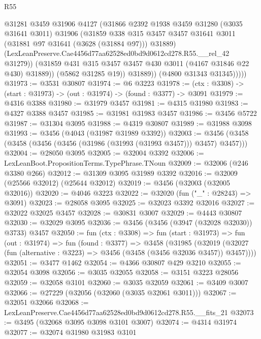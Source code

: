 \begin{lexlean}{R55}
\begin{coremodule}
                    @31281
                    @3459
                    @31906
                    @4127
                    (@31866
                      @2392
                      @1938
                      @3459
                      @31280
                      (@3035 @31641 @3011)
                      @31906
                      (@31859
                        @338
                        @315
                        @3457
                        @3457
                        @31641
                        @3011
                        (@31881 @97 @31641 (@3628 (@31884 @97)))
                        @31889)
                      (LexLeanPreserve.Cae4456d77aa62528ed0bd9d0612cd278.R55.__rel_42 @31279))
                    (@31859 @431 @315 @3457 @3457 @430 @3011 (@4167 @31846 @22 @430) @31889))
                  (@5862 @31285 @19))
                @31889))
            (@4800 @31343 @31345)))))
@31973 := @3531 @30807
@31974 := @6 @3223
@31978 := (ctx : @3308) -> (start : @31973) -> (out : @31974) -> (found : @3377) -> @3091
@31979 := @4316 @3388
@31980 := @31979 @3457
@31981 := @4315 @31980
@31983 := @4327 @3388 @3457
@31985 := @31981 @31983 @3457
@31986 := @3456 @5722
@31987 := @31304 @3095
@31988 := @4319 @30807
@31989 := @31988 @3098
@31993 := @3456 (@4043 (@31987 @31989 @3392))
@32003 := @3456 (@3458 (@3458 (@3456 (@3456 (@31986 (@31993 (@31993 @3457))) @3457) @3457)))
@32004 := @28050 @3095
@32005 := @32004 @3392
@32006 := LexLeanBoot.PropositionTerms.TypePhrase.TNoun
@32009 := @32006 (@246 @3380 @266)
@32012 := @31309 @3095 @31989 @3392
@32016 := @32009 (@25566 @32012) (@25644 @32012)
@32019 := @3456 (@32003 (@32005 @32016))
@32020 := @4046 @3223
@32022 := @32020 (fun ("_" : @28243) => @3091)
@32023 := @28058 @3095
@32025 := @32023 @3392 @32016
@32027 := @32022 @32025 @3457
@32028 := @30831 @3007
@32029 := @4443 @30807
@32030 := @32029 @3095
@32036 := @3456 (@3456 (@3947 (@32028 @32030)) @3733) @3457
@32050 := fun (ctx : @3308) =>
  fun (start : @31973) =>
  fun (out : @31974) =>
  fun (found : @3377) =>
  @3458
    (@31985
      (@32019 (@32027 (fun (alternative : @3223) => @3456 (@3458 (@3456 @32036 @3457)) @3457))))
@32051 := @3477 @1462
@32054 := @4366 @30807 @429 @3210
@32055 := @32054 @3098
@32056 := @3035 @32055
@32058 := @3151 @3223 @28056
@32059 := @32058 @3101
@32060 := @3035 @32059
@32061 := @3409 @3007
@32066 := @27229 (@32056 (@32060 (@3035 @32061 @3011)))
@32067 := @32051 @32066
@32068 := LexLeanPreserve.Cae4456d77aa62528ed0bd9d0612cd278.R55.__fits_21
@32073 := @3495 (@32068 @3095 @3098 @3101 @3007)
@32074 := @4314 @31974
@32077 := @32074 @31980 @31983 @3101

\end{coremodule}
\end{lexlean}
